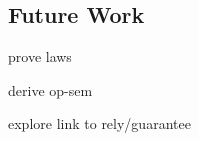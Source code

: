 \subsection{Future Work}\label{ssec:future}

prove laws

derive op-sem

explore link to rely/guarantee
